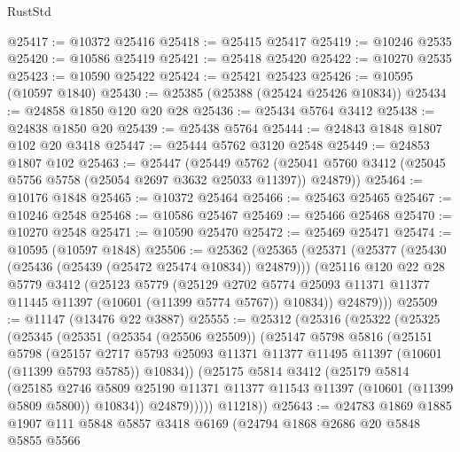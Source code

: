 \begin{lexlean}{RustStd}
\begin{coremodule}
@25417 := @10372 @25416
@25418 := @25415 @25417
@25419 := @10246 @2535
@25420 := @10586 @25419
@25421 := @25418 @25420
@25422 := @10270 @2535
@25423 := @10590 @25422
@25424 := @25421 @25423
@25426 := @10595 (@10597 @1840)
@25430 := @25385 (@25388 (@25424 @25426 @10834))
@25434 := @24858 @1850 @120 @20 @28
@25436 := @25434 @5764 @3412
@25438 := @24838 @1850 @20
@25439 := @25438 @5764
@25444 := @24843 @1848 @1807 @102 @20 @3418
@25447 := @25444 @5762 @3120 @2548
@25449 := @24853 @1807 @102
@25463 := @25447
    (@25449
      @5762
      (@25041 @5760 @3412 (@25045 @5756 @5758 (@25054 @2697 @3632 @25033 @11397)) @24879))
@25464 := @10176 @1848
@25465 := @10372 @25464
@25466 := @25463 @25465
@25467 := @10246 @2548
@25468 := @10586 @25467
@25469 := @25466 @25468
@25470 := @10270 @2548
@25471 := @10590 @25470
@25472 := @25469 @25471
@25474 := @10595 (@10597 @1848)
@25506 := @25362
    (@25365
      (@25371
        (@25377 (@25430 (@25436 (@25439 (@25472 @25474 @10834)) @24879)))
        (@25116
          @120
          @22
          @28
          @5779
          @3412
          (@25123
            @5779
            (@25129
              @2702
              @5774
              @25093
              @11371
              @11377
              @11445
              @11397
              (@10601 (@11399 @5774 @5767))
              @10834))
          @24879)))
@25509 := @11147 (@13476 @22 @3887)
@25555 := @25312
    (@25316
      (@25322
        (@25325
          (@25345
            (@25351
              (@25354 (@25506 @25509))
              (@25147
                @5798
                @5816
                (@25151
                  @5798
                  (@25157
                    @2717
                    @5793
                    @25093
                    @11371
                    @11377
                    @11495
                    @11397
                    (@10601 (@11399 @5793 @5785))
                    @10834))
                (@25175
                  @5814
                  @3412
                  (@25179
                    @5814
                    (@25185
                      @2746
                      @5809
                      @25190
                      @11371
                      @11377
                      @11543
                      @11397
                      (@10601 (@11399 @5809 @5800))
                      @10834))
                  @24879)))))
        @11218))
@25643 := @24783
    @1869
    @1885
    @1907
    @111
    @5848
    @5857
    @3418
    @6169
    (@24794
      @1868
      @2686
      @20
      @5848
      @5855
      @5566

\end{coremodule}
\end{lexlean}
